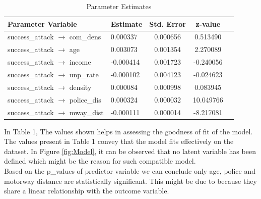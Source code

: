 \documentclass[10pt, conference, compsocconf]{IEEEtran}
\begin{document}
\begin{table}[htbp]
	\centering
	\caption{Parameter Estimates}
	\label{tab:parameter_estimates}
	\begin{tabular}{llSSS}
		\toprule
		Parameter Variable & {Estimate} & {Std. Error} & {z-value} \\
		\midrule
		success\_attack $\longrightarrow$ com\_dens & 0.000337 & 0.000656 & 0.513490 \\
		success\_attack $\longrightarrow$ age & 0.003073 & 0.001354 & 2.270089 \\
		success\_attack $\longrightarrow$ income & -0.000414 & 0.001723 & -0.240056 \\
		success\_attack $\longrightarrow$ unp\_rate & -0.000102 & 0.004123 & -0.024623 \\
		success\_attack $\longrightarrow$ density & 0.000084 & 0.000998 & 0.083945 \\
		success\_attack $\longrightarrow$ police\_dis & 0.000324 & 0.000032 & 10.049766 \\
		success\_attack $\longrightarrow$ mway\_dist & -0.000111 & 0.000014 & -8.217081 \\
		\bottomrule
	\end{tabular}
\end{table}


In Table 1, The values shown helps in assessing the goodness of fit of the model.
The values present in Table 1 convey that the model fits effectively on the dataset. 
In Figure \ref{fig:Model}, it can be observed that no latent variable has been defined which might be the reason for such compatible model.\\
Based on the p\_values of predictor variable we can conclude only age, police and motorway distance are statistically significant. This might be due to because they share a linear relationship with the outcome variable.





	
\end{document}

